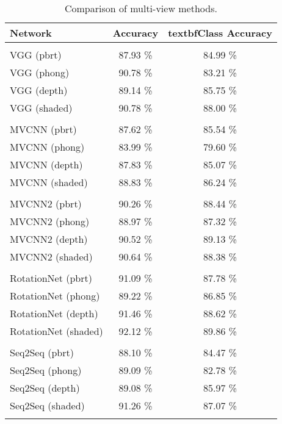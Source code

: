 \begin{table}[]
	\centering
	\begin{tabular}{lcc}
		\hline
		\textbf{Network}     & \textbf{Accuracy} & textbf{Class Accuracy } \\ \hline
		                     &                   &                         \\
		VGG (pbrt)           &     87.93 \%      &        84.99 \%         \\
		VGG (phong)          &     90.78 \%      &        83.21 \%         \\
		VGG (depth)          &     89.14 \%      &        85.75 \%         \\
		VGG (shaded)         &     90.78 \%      &        88.00 \%         \\
		                     &                   &                         \\
		MVCNN (pbrt)         &     87.62 \%      &        85.54 \%         \\
		MVCNN (phong)        &     83.99 \%      &        79.60 \%         \\
		MVCNN (depth)        &     87.83 \%      &        85.07 \%         \\
		MVCNN (shaded)       &     88.83 \%      &        86.24 \%         \\
		                     &                   &                         \\
		MVCNN2 (pbrt)        &     90.26 \%      &        88.44 \%         \\
		MVCNN2 (phong)       &     88.97 \%      &        87.32 \%         \\
		MVCNN2 (depth)       &     90.52 \%      &        89.13 \%         \\
		MVCNN2 (shaded)      &     90.64 \%      &        88.38 \%         \\
		                     &                   &                         \\
		RotationNet (pbrt)   &     91.09 \%      &        87.78 \%         \\
		RotationNet (phong)  &     89.22 \%      &        86.85 \%         \\
		RotationNet (depth)  &     91.46 \%      &        88.62 \%         \\
		RotationNet (shaded) &     92.12 \%      &        89.86 \%         \\
		                     &                   &                         \\
		Seq2Seq  (pbrt)      &     88.10 \%      &        84.47 \%         \\
		Seq2Seq  (phong)     &     89.09 \%      &        82.78 \%         \\
		Seq2Seq  (depth)     &     89.08 \%      &        85.97 \%         \\
		Seq2Seq  (shaded)    &     91.26 \%      &        87.07 \%         \\
		                     &                   &                         \\ \hline
	\end{tabular}
\caption{Comparison of multi-view methods.}
\label{Table:mv}
\end{table}